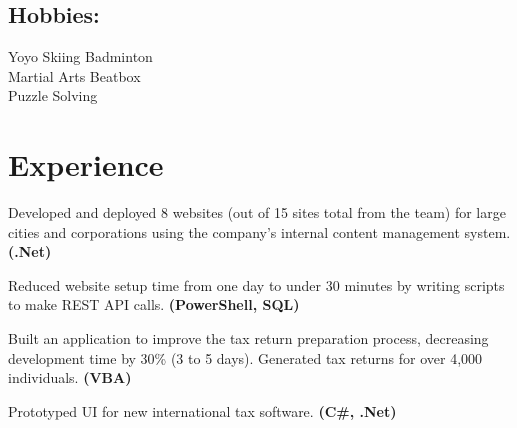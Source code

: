 \documentclass[letterpaper]{kevin-resume} %
\begin{document}
\begin{minipage}[t]{0.30\textwidth}
\subsection{Hobbies:}
Yoyo \textbullet{} 
Skiing \textbullet{} 
Badminton \\
Martial Arts \textbullet{} 
Beatbox \\
Puzzle Solving

\end{minipage} %
\hfill
%
%
\begin{minipage}[t]{0.66\textwidth} %


\section{Experience}

\vspace{\topsep} %
\begin{tightitemize}
	\item Developed and deployed 8 websites (out of 15 sites total from the team) for large cities and corporations using the company's internal content management system. \textbf{(.Net)}
	\item Reduced website setup time from one day to under 30 minutes by writing scripts to make REST API calls. \textbf{(PowerShell, SQL)}
\end{tightitemize}

\sectionspace %


\begin{tightitemize}
	\item Built an application to improve the tax return preparation process, decreasing development time by 30\% (3 to 5 days). Generated tax returns for over 4,000 individuals. \textbf{(VBA)}
	\item Prototyped UI for new international tax software. \textbf{(C\#, .Net)}
\end{tightitemize}


\end{minipage}
\end{document}
